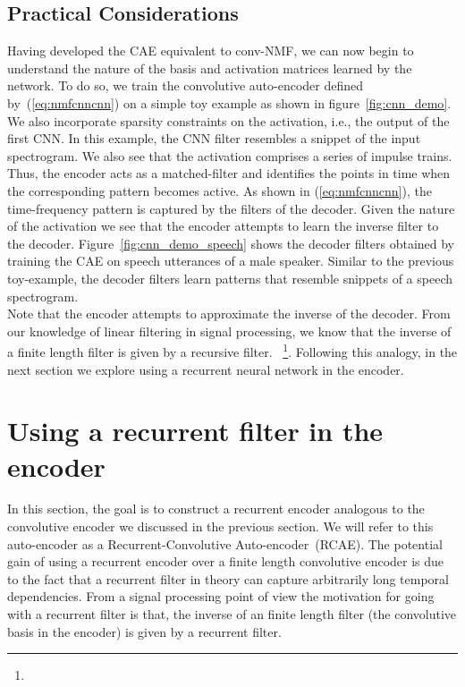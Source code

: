 \documentclass{article}
\begin{document}
\subsection{Practical Considerations}
\label{subsec:practical}
Having developed the CAE equivalent to conv-NMF, we can now begin to understand the nature of the basis and activation matrices learned by the network. To do so, we train the convolutive auto-encoder defined by~(\ref{eq:nmfcnncnn}) on a simple toy example as shown in figure~\ref{fig:cnn_demo}. We also incorporate sparsity constraints on the activation, i.e., the output of the first CNN. In this example, the CNN filter resembles a snippet of the input spectrogram. We also see that the activation comprises a series of impulse trains. Thus, the encoder acts as a matched-filter and identifies the points in time when the corresponding pattern becomes active. As shown in (\ref{eq:nmfcnncnn}), the time-frequency pattern is captured by the filters of the decoder. Given the nature of the activation we see that the encoder attempts to learn the inverse filter to the decoder. Figure~\ref{fig:cnn_demo_speech} shows the decoder filters obtained by training the CAE on speech utterances of a male speaker. Similar to the previous toy-example, the decoder filters learn patterns that resemble snippets of a speech spectrogram. \\

Note that the encoder attempts to approximate the inverse of the decoder. From our knowledge of linear filtering in signal processing, we know that the inverse of a finite length filter is given by a recursive filter. ~\cite{smith2011spectral}\footnote{}. Following this analogy, in the next section we explore using a recurrent neural network in the encoder.

\section{Using a recurrent filter in the encoder}
\label{sec:rnncnn}
In this section, the goal is to construct a recurrent encoder analogous to the convolutive encoder we discussed in the previous section. We will refer to this auto-encoder as a Recurrent-Convolutive Auto-encoder~(RCAE). The potential gain of using a recurrent encoder over a finite length convolutive encoder is due to the fact that a recurrent filter in theory can capture arbitrarily long temporal dependencies. From a signal processing point of view the motivation for going with a recurrent filter is that, the inverse of an finite length filter (the convolutive basis in the encoder) is given by a recurrent filter. \\
\end{document}
